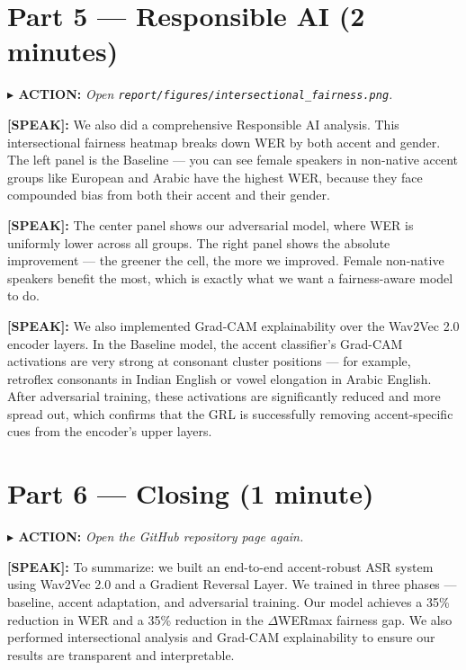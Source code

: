 \documentclass[12pt,a4paper]{article}
\newcommand{\say}[1]{%
  \begin{speakbox}
  \textbf{\color{speakblue}[SPEAK]:} #1
  \end{speakbox}
  \vspace{4pt}
}
\newcommand{\action}[1]{%
  \vspace{2pt}
  \noindent\textbf{\color{sectionred}$\blacktriangleright$ ACTION:} \textit{#1}
  \vspace{4pt}
}
\begin{document}
\section{Part 5 --- Responsible AI (2 minutes)}

\action{Open \texttt{report/figures/intersectional\_fairness.png}.}

\say{We also did a comprehensive Responsible AI analysis. This intersectional fairness
heatmap breaks down WER by both accent and gender. The left panel is the Baseline --- you
can see female speakers in non-native accent groups like European and Arabic have the
highest WER, because they face compounded bias from both their accent and their gender.}

\say{The center panel shows our adversarial model, where WER is uniformly lower across
all groups. The right panel shows the absolute improvement --- the greener the cell, the
more we improved. Female non-native speakers benefit the most, which is exactly what we
want a fairness-aware model to do.}

\say{We also implemented Grad-CAM explainability over the Wav2Vec 2.0 encoder layers.
In the Baseline model, the accent classifier's Grad-CAM activations are very strong at
consonant cluster positions --- for example, retroflex consonants in Indian English or
vowel elongation in Arabic English. After adversarial training, these activations are
significantly reduced and more spread out, which confirms that the GRL is successfully
removing accent-specific cues from the encoder's upper layers.}

\section{Part 6 --- Closing (1 minute)}

\action{Open the GitHub repository page again.}

\say{To summarize: we built an end-to-end accent-robust ASR system using Wav2Vec 2.0 and
a Gradient Reversal Layer. We trained in three phases --- baseline, accent adaptation, and
adversarial training. Our model achieves a 35\% reduction in WER and a 35\% reduction in
the $\Delta$WERmax fairness gap. We also performed intersectional analysis and Grad-CAM
explainability to ensure our results are transparent and interpretable.}
\end{document}
